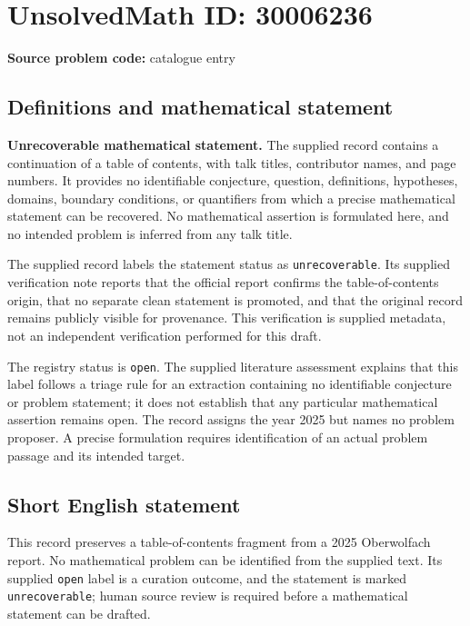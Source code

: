 \documentclass[11pt]{article}
\begin{document}
\section*{UnsolvedMath ID: 30006236}
\textbf{Source problem code:} catalogue entry
\subsection{Definitions and mathematical statement}
\textbf{Unrecoverable mathematical statement.} The supplied record contains a continuation of a table of contents, with talk titles, contributor names, and page numbers. It provides no identifiable conjecture, question, definitions, hypotheses, domains, boundary conditions, or quantifiers from which a precise mathematical statement can be recovered. No mathematical assertion is formulated here, and no intended problem is inferred from any talk title.

The supplied record labels the statement status as \texttt{unrecoverable}. Its supplied verification note reports that the official report confirms the table-of-contents origin, that no separate clean statement is promoted, and that the original record remains publicly visible for provenance. This verification is supplied metadata, not an independent verification performed for this draft.

The registry status is \texttt{open}. The supplied literature assessment explains that this label follows a triage rule for an extraction containing no identifiable conjecture or problem statement; it does not establish that any particular mathematical assertion remains open. The record assigns the year 2025 but names no problem proposer. A precise formulation requires identification of an actual problem passage and its intended target.
\subsection{Short English statement}
This record preserves a table-of-contents fragment from a 2025 Oberwolfach report. No mathematical problem can be identified from the supplied text. Its supplied \texttt{open} label is a curation outcome, and the statement is marked \texttt{unrecoverable}; human source review is required before a mathematical statement can be drafted.
\end{document}
